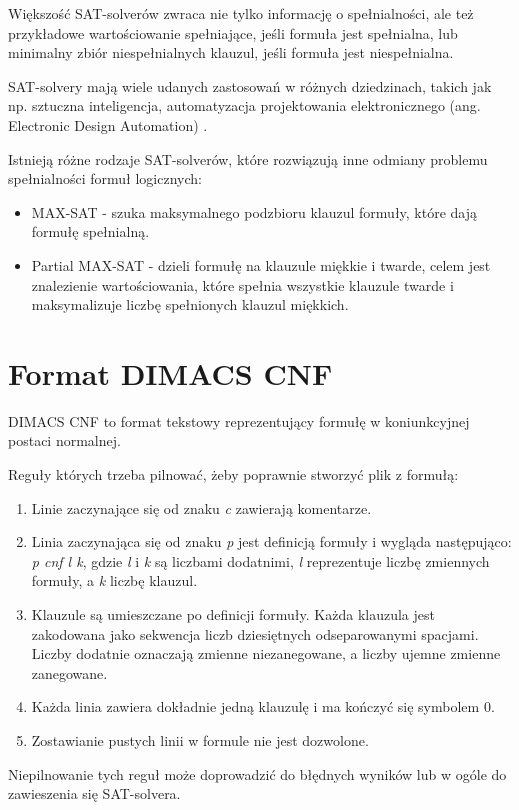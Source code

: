 \documentclass[a4paper,12pt]{book}
\theoremstyle{definition}
\begin{document}
Większość SAT-solverów zwraca nie tylko informację o spełnialności, ale też przykładowe wartościowanie spełniające, jeśli formuła jest spełnialna, lub minimalny zbiór niespełnialnych klauzul, jeśli formuła jest niespełnialna.

SAT-solvery mają wiele udanych zastosowań w różnych dziedzinach, takich jak np. sztuczna inteligencja, automatyzacja projektowania elektronicznego (ang. Electronic Design Automation) \cite{pmsat}.

Istnieją różne rodzaje SAT-solverów, które rozwiązują inne odmiany problemu spełnialności formuł logicznych: 

\begin{itemize}
    \item MAX-SAT - szuka maksymalnego podzbioru klauzul formuły, które dają formułę spełnialną.
    \item Partial MAX-SAT \cite{pmsat} - dzieli formułę na klauzule miękkie i twarde, celem jest znalezienie wartościowania, które spełnia wszystkie klauzule twarde i maksymalizuje liczbę spełnionych klauzul miękkich.

\end{itemize}

\section{Format DIMACS CNF}

DIMACS CNF \cite{dimacsdocs} to format tekstowy reprezentujący formułę w koniunkcyjnej postaci normalnej. 

Reguły których trzeba pilnować, żeby poprawnie stworzyć plik z formułą: 

\begin{enumerate}
    \item Linie zaczynające się od znaku \textit{c} zawierają komentarze.
    \item Linia zaczynająca się od znaku \textit{p} jest definicją formuły i wygląda następująco: \textit{p cnf l k}, gdzie \textit{l} i \textit{k} są liczbami dodatnimi, \textit{l} reprezentuje liczbę zmiennych formuły, a \textit{k} liczbę klauzul.
    \item Klauzule są umieszczane po definicji formuły. Każda klauzula jest zakodowana jako sekwencja liczb dziesiętnych odseparowanymi spacjami. Liczby dodatnie oznaczają zmienne niezanegowane, a liczby ujemne zmienne zanegowane.
    \item Każda linia zawiera dokładnie jedną klauzulę i ma kończyć się symbolem 0.
    \item Zostawianie pustych linii w formule nie jest dozwolone.
\end{enumerate}
Niepilnowanie tych reguł może doprowadzić do błędnych wyników lub w ogóle do zawieszenia się SAT-solvera.
\end{document}

